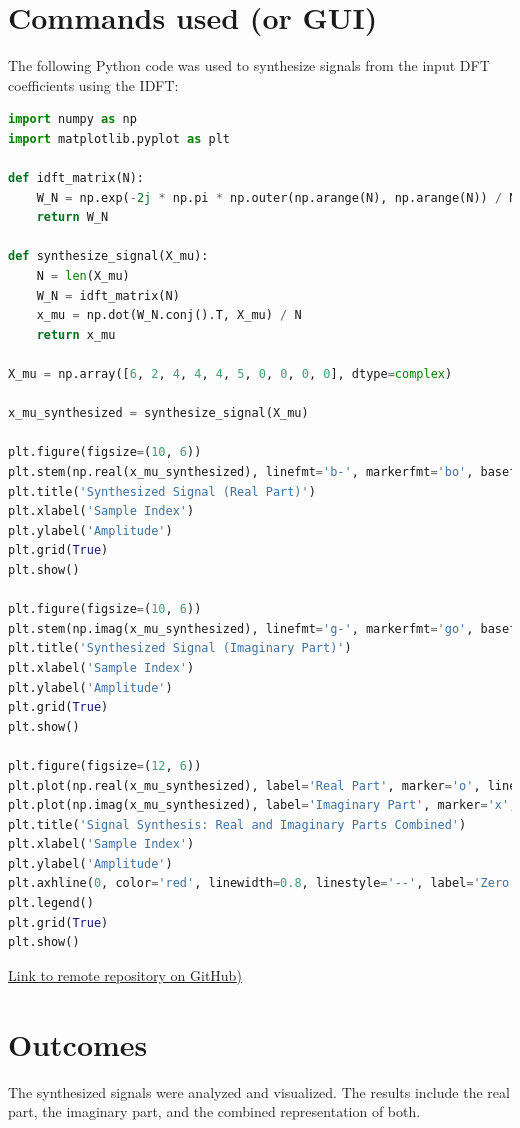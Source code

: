 \documentclass[12pt]{article}
\begin{document}
\section{Commands used (or GUI)}
The following Python code was used to synthesize signals from the input DFT coefficients using the IDFT:

\begin{lstlisting}[language=Python, breaklines=true]
import numpy as np
import matplotlib.pyplot as plt

def idft_matrix(N):
    W_N = np.exp(-2j * np.pi * np.outer(np.arange(N), np.arange(N)) / N)
    return W_N

def synthesize_signal(X_mu):
    N = len(X_mu)
    W_N = idft_matrix(N)
    x_mu = np.dot(W_N.conj().T, X_mu) / N
    return x_mu

X_mu = np.array([6, 2, 4, 4, 4, 5, 0, 0, 0, 0], dtype=complex)

x_mu_synthesized = synthesize_signal(X_mu)

plt.figure(figsize=(10, 6))
plt.stem(np.real(x_mu_synthesized), linefmt='b-', markerfmt='bo', basefmt='r-')
plt.title('Synthesized Signal (Real Part)')
plt.xlabel('Sample Index')
plt.ylabel('Amplitude')
plt.grid(True)
plt.show()

plt.figure(figsize=(10, 6))
plt.stem(np.imag(x_mu_synthesized), linefmt='g-', markerfmt='go', basefmt='r-')
plt.title('Synthesized Signal (Imaginary Part)')
plt.xlabel('Sample Index')
plt.ylabel('Amplitude')
plt.grid(True)
plt.show()

plt.figure(figsize=(12, 6))
plt.plot(np.real(x_mu_synthesized), label='Real Part', marker='o', linestyle='-', color='b')
plt.plot(np.imag(x_mu_synthesized), label='Imaginary Part', marker='x', linestyle='--', color='g')
plt.title('Signal Synthesis: Real and Imaginary Parts Combined')
plt.xlabel('Sample Index')
plt.ylabel('Amplitude')
plt.axhline(0, color='red', linewidth=0.8, linestyle='--', label='Zero Line')
plt.legend()
plt.grid(True)
plt.show()

\end{lstlisting}
\item \href{https://github.com/DariaKrecichwostQA/StudiaUBB/tree/main/Digital%20Signal%20Processing/Zad1}{{Link to remote repository on GitHub})}

\newpage
\section{Outcomes}
The synthesized signals were analyzed and visualized. The results include the real part, the imaginary part, and the combined representation of both.
\end{document}
